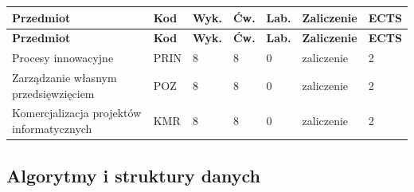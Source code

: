 \documentclass[12pt,a4paper]{article}
\newcommand{\thdrule}{\noalign{\global\setlength{\extrarowheight}{0pt}}}
\newcommand{\thdend}{\noalign{\global\setlength{\extrarowheight}{4pt}}}
\begin{document}
{\scriptsize
\begin{longtable}{m{5.5cm}m{0.8cm}m{1cm}m{1cm}m{1cm}m{1.7cm}m{0.7cm}}
\thdrule\toprule
\rowcolor{pjatkRed}
{\color{white}\footnotesize\textbf{\vphantom{Ag}Przedmiot}} & {\color{white}\footnotesize\textbf{\vphantom{Ag}Kod}} & {\color{white}\footnotesize\textbf{\vphantom{Ag}Wyk.}} & {\color{white}\footnotesize\textbf{\vphantom{Ag}Ćw.}} & {\color{white}\footnotesize\textbf{\vphantom{Ag}Lab.}} & {\color{white}\footnotesize\textbf{\vphantom{Ag}Zaliczenie}} & {\color{white}\footnotesize\textbf{\vphantom{Ag}ECTS}} \\
\midrule\thdend
\endfirsthead
\thdrule\toprule
\rowcolor{pjatkRed}
{\color{white}\footnotesize\textbf{\vphantom{Ag}Przedmiot}} & {\color{white}\footnotesize\textbf{\vphantom{Ag}Kod}} & {\color{white}\footnotesize\textbf{\vphantom{Ag}Wyk.}} & {\color{white}\footnotesize\textbf{\vphantom{Ag}Ćw.}} & {\color{white}\footnotesize\textbf{\vphantom{Ag}Lab.}} & {\color{white}\footnotesize\textbf{\vphantom{Ag}Zaliczenie}} & {\color{white}\footnotesize\textbf{\vphantom{Ag}ECTS}} \\
\midrule\thdend
\endhead
\rowcolor{tableRowLight} Procesy innowacyjne & PRIN & 8 & 8 & 0 & {\scriptsize zaliczenie} & 2 \\
\rowcolor{tableRowAlt} Zarządzanie własnym przedsięwzięciem & POZ & 8 & 8 & 0 & {\scriptsize zaliczenie} & 2 \\
\rowcolor{tableRowLight} Komercjalizacja projektów informatycznych & KMR & 8 & 8 & 0 & {\scriptsize zaliczenie} & 2 \\
\bottomrule
\end{longtable}}

\subsection*{Algorytmy i struktury danych}
\end{document}
